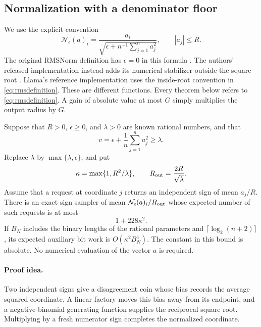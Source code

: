 \subsection{Normalization with a denominator floor}
\label{sec:rmsnorm}

We use the explicit convention
\begin{equation}
 \mathcal N_{\epsilon}(a)_i
 =\frac{a_i}{\sqrt{\epsilon+n^{-1}\sum_{j=1}^n a_j^2}},
 \qquad |a_j|\le R.
 \label{eq:rmsdefinition}
\end{equation}
The original RMSNorm definition has $\epsilon=0$ in this formula
\cite[Eq.~(4)]{zhang2019rmsnorm}. The authors' released implementation
instead adds its numerical stabilizer outside the square root
\cite{zhang2019rmscode}. Llama's reference implementation uses the
inside-root convention in \eqref{eq:rmsdefinition}\cite{llamarmscode}.
These are different functions. Every theorem below refers to
\eqref{eq:rmsdefinition}. A gain of absolute value at most $G$ simply
multiplies the output radius by $G$.

\begin{theorem}
\label{thm:rmsfloor}
Suppose that $R>0$, $\epsilon\ge0$, and $\lambda>0$ are known rational
numbers, and that
\[
 v=\epsilon+\frac1n\sum_{j=1}^n a_j^2\ge\lambda.
\]
Replace $\lambda$ by $\max\{\lambda,\epsilon\}$, and put
\[
 \kappa=\max\{1,R^2/\lambda\},
 \qquad R_{\rm out}=\frac{2R}{\sqrt\lambda}.
\]
Assume that a request at coordinate $j$ returns an independent sign of
mean $a_j/R$. There is an exact sign sampler of mean
$\mathcal N_\epsilon(a)_i/R_{\rm out}$ whose expected number of such
requests is at most
\begin{equation}
 1+228\kappa^2.
 \label{eq:rmschildbound}
\end{equation}
If $B_N$ includes the binary lengths of the rational parameters and
$\lceil\log_2(n+2)\rceil$, its expected auxiliary bit work is
$O(\kappa^2B_N^4)$. The constant in this bound is absolute. No numerical
evaluation of the vector $a$ is required.
\end{theorem}

\paragraph{Proof idea.}
Two independent signs give a disagreement coin whose bias records the
average squared coordinate. A linear factory moves this bias away from its
endpoint, and a negative-binomial generating function supplies the reciprocal
square root. Multiplying by a fresh numerator sign completes the normalized
coordinate.

